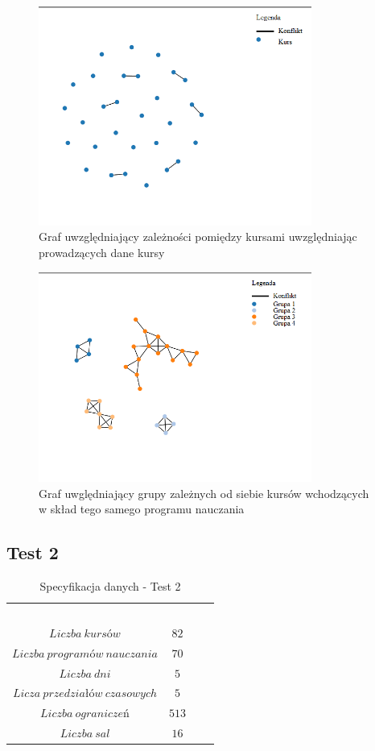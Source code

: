 \begin{figure}[H]
  \caption{Graf uwzględniający zależności pomiędzy kursami uwzględniając prowadzących dane kursy}
  \centering
    \includegraphics[width=0.8\textwidth]{test1_teach.PNG}
\end{figure}
\begin{figure}[H]
  \caption{Graf uwględniający grupy zależnych od siebie kursów wchodzących w skład tego samego programu nauczania}
  \centering
    \includegraphics[width=0.8\textwidth]{test1_con.PNG}
\end{figure}
\subsection{Test 2}
\begin{table}[H]
\begin{center}

\begin{tabular}{ |c|c|c|c| }
\multicolumn{1}{r}{}
 &  \multicolumn{1}{c}{$$}
 & \multicolumn{1}{c}{$$} 
 \\
\cline{1-2}
$Liczba\ kursów$ & $82$\\
\cline{1-2}
$Liczba\ programów\ nauczania$ & $70$\\
\cline{1-2}
$Liczba\ dni$ & $5$ \\
\cline{1-2}
$Licza\ przedziałów\ czasowych$ & $5$ \\
\cline{1-2}
$Liczba\ ograniczeń$ & $513$ \\
\cline{1-2}
$Liczba\ sal$ & $16$ \\
\cline{1-2}
\end{tabular}
\end{center}
\caption {Specyfikacja danych - Test 2}
\end{table}
